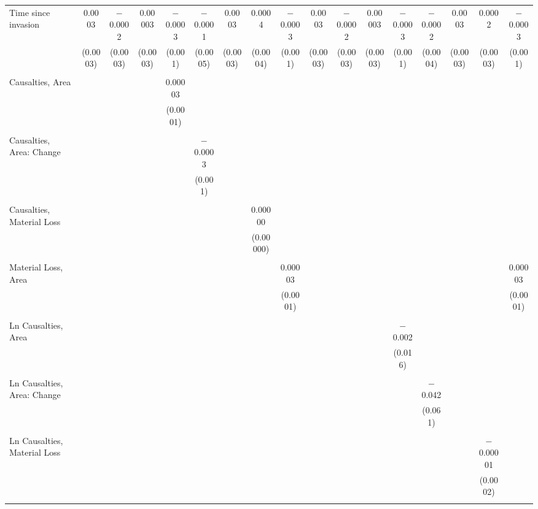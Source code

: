 \begin{table}[!htbp]
\begin{tabular}{@{\extracolsep{5pt}}lcccccccccccccccc}
 Time since invasion & 0.0003 & $-$0.0002 & 0.00003 & $-$0.0003 & $-$0.0001 & 0.0003 & 0.0004 & $-$0.0003 & 0.0003 & $-$0.0002 & 0.00003 & $-$0.0003 & $-$0.0002 & 0.0003 & 0.0002 & $-$0.0003 \\ 
  & (0.0003) & (0.0003) & (0.0003) & (0.001) & (0.0005) & (0.0003) & (0.0004) & (0.001) & (0.0003) & (0.0003) & (0.0003) & (0.001) & (0.0004) & (0.0003) & (0.0003) & (0.001) \\ 
  & & & & & & & & & & & & & & & & \\ 
 Causalties, Area &  &  &  & 0.00003 &  &  &  &  &  &  &  &  &  &  &  &  \\ 
  &  &  &  & (0.0001) &  &  &  &  &  &  &  &  &  &  &  &  \\ 
  & & & & & & & & & & & & & & & & \\ 
 Causalties, Area: Change &  &  &  &  & $-$0.0003 &  &  &  &  &  &  &  &  &  &  &  \\ 
  &  &  &  &  & (0.001) &  &  &  &  &  &  &  &  &  &  &  \\ 
  & & & & & & & & & & & & & & & & \\ 
 Causalties, Material Loss &  &  &  &  &  &  & 0.00000 &  &  &  &  &  &  &  &  &  \\ 
  &  &  &  &  &  &  & (0.00000) &  &  &  &  &  &  &  &  &  \\ 
  & & & & & & & & & & & & & & & & \\ 
 Material Loss, Area &  &  &  &  &  &  &  & 0.00003 &  &  &  &  &  &  &  & 0.00003 \\ 
  &  &  &  &  &  &  &  & (0.0001) &  &  &  &  &  &  &  & (0.0001) \\ 
  & & & & & & & & & & & & & & & & \\ 
 Ln Causalties, Area &  &  &  &  &  &  &  &  &  &  &  & $-$0.002 &  &  &  &  \\ 
  &  &  &  &  &  &  &  &  &  &  &  & (0.016) &  &  &  &  \\ 
  & & & & & & & & & & & & & & & & \\ 
 Ln Causalties, Area: Change &  &  &  &  &  &  &  &  &  &  &  &  & $-$0.042 &  &  &  \\ 
  &  &  &  &  &  &  &  &  &  &  &  &  & (0.061) &  &  &  \\ 
  & & & & & & & & & & & & & & & & \\ 
 Ln Causalties, Material Loss &  &  &  &  &  &  &  &  &  &  &  &  &  &  & $-$0.00001 &  \\ 
  &  &  &  &  &  &  &  &  &  &  &  &  &  &  & (0.0002) &  \\ 
  & & & & & & & & & & & & & & & & \\ 

\end{tabular}
\end{table}
